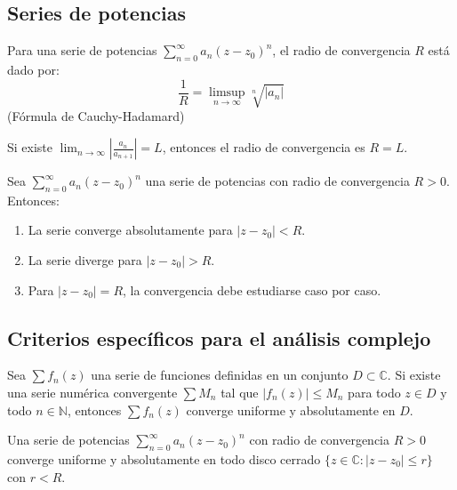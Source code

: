 \subsection{Series de potencias}

\begin{definición}
    Para una serie de potencias $\sum_{n=0}^\infty a_n (z-z_0)^n$, el radio de convergencia $R$ está dado por:
    \[
    \frac{1}{R} = \limsup_{n \to \infty} \sqrt[n]{|a_n|}
    \]
    (Fórmula de Cauchy-Hadamard)
\end{definición}

\begin{teorema}
    Si existe $\lim_{n \to \infty} \left|\frac{a_n}{a_{n+1}}\right| = L$, entonces el radio de convergencia es $R = L$.
\end{teorema}

\begin{teorema}
    Sea $\sum_{n=0}^\infty a_n (z-z_0)^n$ una serie de potencias con radio de convergencia $R > 0$. Entonces:
    \begin{enumerate}
        \item La serie converge absolutamente para $|z-z_0| < R$.
        \item La serie diverge para $|z-z_0| > R$.
        \item Para $|z-z_0| = R$, la convergencia debe estudiarse caso por caso.
    \end{enumerate}
\end{teorema}

\subsection{Criterios específicos para el análisis complejo}

\begin{teorema}
    Sea $\sum f_n(z)$ una serie de funciones definidas en un conjunto $D \subset \mathbb{C}$. Si existe una serie numérica convergente $\sum M_n$ tal que $|f_n(z)| \leq M_n$ para todo $z \in D$ y todo $n \in \mathbb{N}$, entonces $\sum f_n(z)$ converge uniforme y absolutamente en $D$.
\end{teorema}

\begin{teorema}
    Una serie de potencias $\sum_{n=0}^\infty a_n (z-z_0)^n$ con radio de convergencia $R > 0$ converge uniforme y absolutamente en todo disco cerrado $\{z \in \mathbb{C} : |z-z_0| \leq r\}$ con $r < R$.
\end{teorema}

